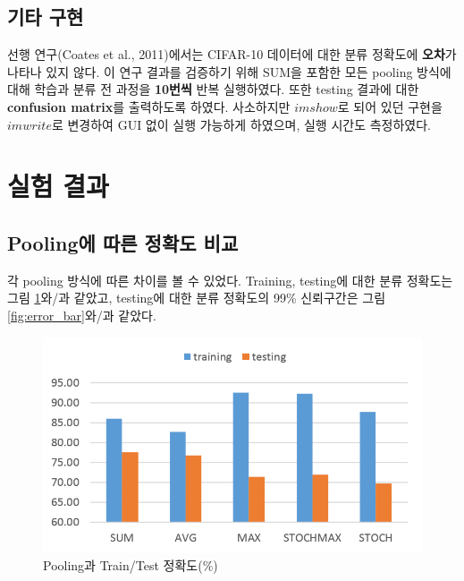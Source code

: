 \documentclass[a4paper,9pt]{article}
\begin{document}
\begin{multicols*}{2}
\subsection{기타 구현}

선행 연구(Coates et al., 2011)에서는 CIFAR-10 데이터에 대한 분류 정확도에 \textbf{오차}가 나타나 있지 않다.
이 연구 결과를 검증하기 위해 SUM을 포함한 모든 pooling 방식에 대해 학습과 분류 전 과정을 \textbf{10번씩} 반복 실행하였다.
또한 testing 결과에 대한 \textbf{confusion matrix}를 출력하도록 하였다.
사소하지만 $imshow$로 되어 있던 구현을 $imwrite$로 변경하여 GUI 없이 실행 가능하게 하였으며, 실행 시간도 측정하였다.

\section{실험 결과}

\subsection{Pooling에 따른 정확도 비교}

각 pooling 방식에 따른 차이를 볼 수 있었다.
Training, testing에 대한 분류 정확도는 그림 \ref{fig:accuracy}와/과 같았고, testing에 대한 분류 정확도의 99\% 신뢰구간은 그림 \ref{fig:error_bar}와/과 같았다.

\begin{figure}[H]
\includegraphics[width=\linewidth]{accuracy}
\caption{Pooling과 Train/Test 정확도(\%)}
\label{fig:accuracy}
\end{figure}


\end{multicols*}
\end{document}
